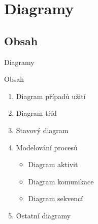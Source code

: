 \section{Diagramy}


\subsection{Obsah}


\begin{frame}{Diagramy}

\onslide<+-> Obsah

\begin{enumerate}
	\item Diagram případů užití
	\item Diagram tříd 
	\item Stavový diagram 
	\item Modelování procesů
	\begin{itemize}
		\item Diagram aktivit
		\item Diagram komunikace
		\item Diagram sekvencí
	\end{itemize}
	\item Ostatní diagramy
\end{enumerate}

\end{frame}


	
	
	
	
	
